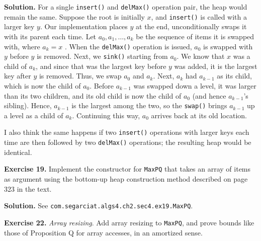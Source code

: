 \documentclass[12pt, a4paper]{article}
\newenvironment{ex}[2][Exercise]
{\par\medskip\noindent \textbf{#1 #2.}}
{\medskip}
\newenvironment{sol}[1][Solution]
{\par\medskip\noindent \textbf{#1.} }
{\medskip}
\begin{document}
	\begin{sol}
		For a single \texttt{insert()} and \texttt{delMax()} operation pair, the heap would remain
		the same. Suppose the root is initially $x$, and \texttt{insert()} is called
		with a larger key $y$. Our implementation places $y$ at the end,
		unconditionally swaps it with its parent each time. Let $a_0,a_1,\ldots,a_k$ be
		the sequence of items it is swapped with, where $a_k=x$ . When the \texttt{delMax()}
		operation is issued, $a_0$ is swapped with $y$ before $y$ is removed. Next,
		we \texttt{sink()} starting from $a_0$. We know that $x$ was a child of
		$a_k$, and since that was the largest key before $y$ was added, it is the
		largest key after $y$ is removed. Thus, we swap $a_0$ and $a_k$. Next, $a_k$
		had $a_{k-1}$ as its child, which is now the child of $a_0$. Before $a_{k-1}$
		was swapped down a level, it was larger than its two children, and its old child
		is now the child of $a_0$ (and hence $a_{k-1}$'s sibling). Hence, $a_{k-1}$
		is the largest among the two, so the \texttt{swap()} brings $a_{k-1}$ up a level
		as a child of $a_{k}$. Continuing this way, $a_0$ arrives back at its old location.
		
		I also think the same happens if two \texttt{insert()} operations with larger
		keys each time are then followed by two \texttt{delMax()} operations; the
		resulting heap would be identical.
	\end{sol}
	\begin{ex}{19}
		Implement the constructor for \texttt{MaxPQ} that takes an array of items as
		argument using the bottom-up heap construction method described on page 323
		in the text.
	\end{ex}
	\begin{sol}
		See \texttt{com.segarciat.algs4.ch2.sec4.ex19.MaxPQ}.
	\end{sol}
	\begin{ex}{22}
		\emph{Array resizing}. Add array resizing to \texttt{MaxPQ}, and prove bounds
		like those of Proposition Q for array accesses, in an amortized sense.
	\end{ex}
\end{document}
